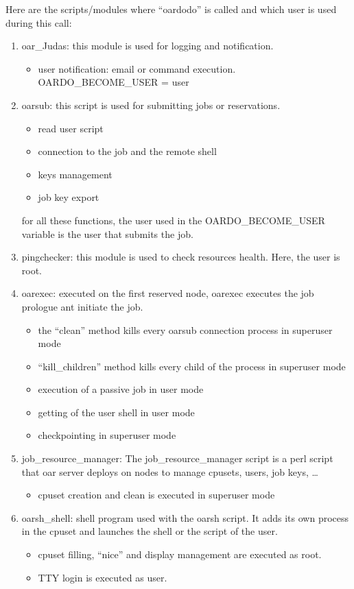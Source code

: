 \documentclass[a4paper,10pt]{article}
\begin{document}
Here are the scripts/modules where ``oardodo'' is called and which user is used during this call:
\begin{enumerate}
 \item oar\_Judas:
	this module is used for logging and notification.
	\begin{itemize}
 		\item user notification: email or command execution.\\OARDO\_BECOME\_USER = user
	\end{itemize}
 \item oarsub:
	this script is used for submitting jobs or reservations.
	\begin{itemize}
 		\item read user script
		\item connection to the job and the remote shell
		\item keys management
		\item job key export
	\end{itemize}
	for all these functions, the user used in the OARDO\_BECOME\_USER variable is the user that submits the job.
 \item pingchecker:
	this module is used to check resources health. Here, the user is root.
 \item oarexec: 
	executed on the first reserved node, oarexec executes the job prologue ant initiate the job.
	\begin{itemize}
 		\item the ``clean'' method kills every oarsub connection process in superuser mode
		\item ``kill\_children'' method kills every child of the process in superuser mode
		\item execution of a passive job in user mode
		\item getting of the user shell in user mode
		\item checkpointing in superuser mode
	\end{itemize}

 \item job\_resource\_manager:
	The job\_resource\_manager script is a perl script that oar server deploys on nodes to manage cpusets, users, job keys, \ldots
	\begin{itemize}
 		\item cpuset creation and clean is executed in superuser mode
	\end{itemize}

 \item oarsh\_shell: 
	shell program used with the oarsh script. It adds its own process in the cpuset and launches the shell or the script of the user.
	\begin{itemize}
 		\item cpuset filling, ``nice'' and display management are executed as root.
		\item TTY login is executed as user.
	\end{itemize}


\end{enumerate}
\end{document}
